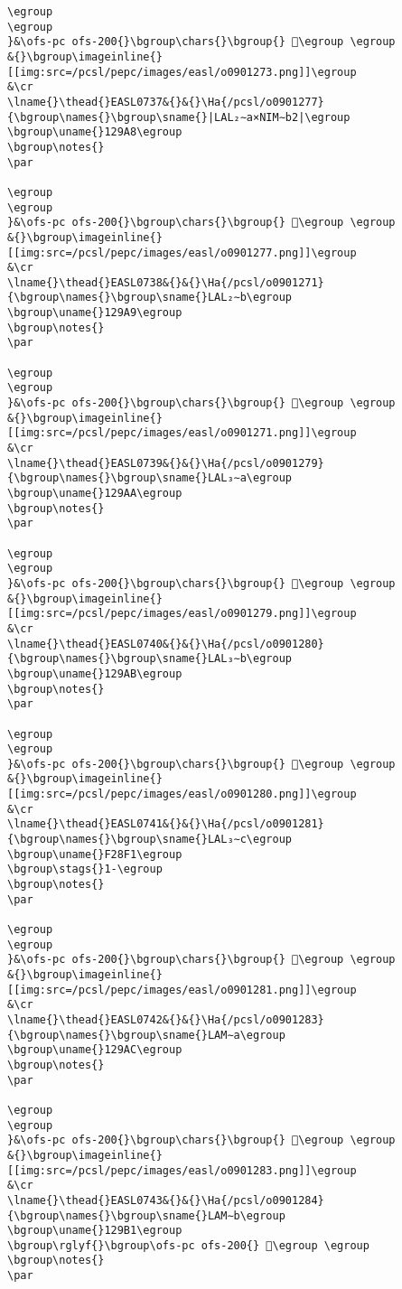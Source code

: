 \begin{verbatim}
\egroup
\egroup
}&\ofs-pc ofs-200{}\bgroup\chars{}\bgroup{} 𒦧\egroup \egroup
&{}\bgroup\imageinline{}[[img:src=/pcsl/pepc/images/easl/o0901273.png]]\egroup
&\cr
\lname{}\thead{}EASL0737&{}&{}\Ha{/pcsl/o0901277}{\bgroup\names{}\bgroup\sname{}|LAL₂∼a×NIM∼b2|\egroup
\bgroup\uname{}129A8\egroup
\bgroup\notes{}
\par 

\egroup
\egroup
}&\ofs-pc ofs-200{}\bgroup\chars{}\bgroup{} 𒦨\egroup \egroup
&{}\bgroup\imageinline{}[[img:src=/pcsl/pepc/images/easl/o0901277.png]]\egroup
&\cr
\lname{}\thead{}EASL0738&{}&{}\Ha{/pcsl/o0901271}{\bgroup\names{}\bgroup\sname{}LAL₂∼b\egroup
\bgroup\uname{}129A9\egroup
\bgroup\notes{}
\par 

\egroup
\egroup
}&\ofs-pc ofs-200{}\bgroup\chars{}\bgroup{} 𒦩\egroup \egroup
&{}\bgroup\imageinline{}[[img:src=/pcsl/pepc/images/easl/o0901271.png]]\egroup
&\cr
\lname{}\thead{}EASL0739&{}&{}\Ha{/pcsl/o0901279}{\bgroup\names{}\bgroup\sname{}LAL₃∼a\egroup
\bgroup\uname{}129AA\egroup
\bgroup\notes{}
\par 

\egroup
\egroup
}&\ofs-pc ofs-200{}\bgroup\chars{}\bgroup{} 𒦪\egroup \egroup
&{}\bgroup\imageinline{}[[img:src=/pcsl/pepc/images/easl/o0901279.png]]\egroup
&\cr
\lname{}\thead{}EASL0740&{}&{}\Ha{/pcsl/o0901280}{\bgroup\names{}\bgroup\sname{}LAL₃∼b\egroup
\bgroup\uname{}129AB\egroup
\bgroup\notes{}
\par 

\egroup
\egroup
}&\ofs-pc ofs-200{}\bgroup\chars{}\bgroup{} 𒦫\egroup \egroup
&{}\bgroup\imageinline{}[[img:src=/pcsl/pepc/images/easl/o0901280.png]]\egroup
&\cr
\lname{}\thead{}EASL0741&{}&{}\Ha{/pcsl/o0901281}{\bgroup\names{}\bgroup\sname{}LAL₃∼c\egroup
\bgroup\uname{}F28F1\egroup
\bgroup\stags{}1-\egroup
\bgroup\notes{}
\par 

\egroup
\egroup
}&\ofs-pc ofs-200{}\bgroup\chars{}\bgroup{} 󲣱\egroup \egroup
&{}\bgroup\imageinline{}[[img:src=/pcsl/pepc/images/easl/o0901281.png]]\egroup
&\cr
\lname{}\thead{}EASL0742&{}&{}\Ha{/pcsl/o0901283}{\bgroup\names{}\bgroup\sname{}LAM∼a\egroup
\bgroup\uname{}129AC\egroup
\bgroup\notes{}
\par 

\egroup
\egroup
}&\ofs-pc ofs-200{}\bgroup\chars{}\bgroup{} 𒦬\egroup \egroup
&{}\bgroup\imageinline{}[[img:src=/pcsl/pepc/images/easl/o0901283.png]]\egroup
&\cr
\lname{}\thead{}EASL0743&{}&{}\Ha{/pcsl/o0901284}{\bgroup\names{}\bgroup\sname{}LAM∼b\egroup
\bgroup\uname{}129B1\egroup
\bgroup\rglyf{}\bgroup\ofs-pc ofs-200{} 𒦱\egroup \egroup
\bgroup\notes{}
\par 


\end{verbatim}
